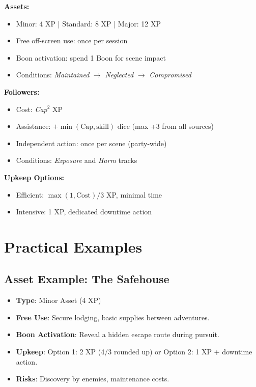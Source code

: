 \begin{tcolorbox}[colback=blue!5!white,colframe=blue!75!black,title=Assets and Followers Quick Reference,fonttitle=\bfseries]
\textbf{Assets:}
\begin{itemize}
\item Minor: 4 XP \;|\; Standard: 8 XP \;|\; Major: 12 XP
\item Free off-screen use: once per session
\item Boon activation: spend 1 Boon for scene impact
\item Conditions: \emph{Maintained} $\rightarrow$ \emph{Neglected} $\rightarrow$ \emph{Compromised}
\end{itemize}

\textbf{Followers:}
\begin{itemize}
\item Cost: \emph{Cap}$^2$ XP
\item Assistance: $+\min(\text{Cap},\text{skill})$ dice (max +3 from all sources)
\item Independent action: once per scene (party-wide)
\item Conditions: \emph{Exposure} and \emph{Harm} tracks
\end{itemize}

\textbf{Upkeep Options:}
\begin{itemize}
\item Efficient: $\max(1,\text{Cost})/3$ XP, minimal time
\item Intensive: 1 XP, dedicated downtime action
\end{itemize}
\end{tcolorbox}

\section{Practical Examples}

\subsection*{Asset Example: The Safehouse}
\begin{itemize}
\item \textbf{Type}: Minor Asset (4 XP)
\item \textbf{Free Use}: Secure lodging, basic supplies between adventures.
\item \textbf{Boon Activation}: Reveal a hidden escape route during pursuit.
\item \textbf{Upkeep}: Option 1: 2 XP (4/3 rounded up) or Option 2: 1 XP + downtime action.
\item \textbf{Risks}: Discovery by enemies, maintenance costs.
\end{itemize}

